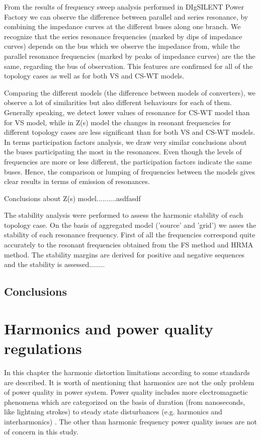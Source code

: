\documentclass[12pt]{report} %
\begin{document}
From the results of frequency sweep analysis performed in DIgSILENT Power Factory we can observe the difference between parallel and series resonance, by combining the impedance curves at the different buses along one branch. We recognize that the series resonance frequencies (marked by dips of impedance curves) depends on the bus which we observe the impedance from, while the parallel resonance frequencies (marked by peaks of impedance curves) are the the same, regarding the bus of observation. This features are confirmed for all of the topology cases as well as for both VS and CS-WT models.

Comparing the different models (the difference between models of converters), we observe a lot of similarities but also different behaviours for each of them. Generally speaking, we detect lower values of resonance for CS-WT model than for VS model, while in Z(s) model the changes in resonant frequencies for different topology cases are less significant than for both VS and CS-WT models. In terms participation factors analysis, we draw very similar conclusions about the buses participating the most in the resonances. Even though the levels of frequencies are more or less different, the participation factors indicate the same buses. Hence, the comparison or lumping of frequencies between the models gives clear results in terms of emission of resonances.

Conclusions about Z(s) model..........asdfasdf

The stability analysis were performed to assess the harmonic stability of each topology case. On the basis of aggregated model ('source' and 'grid') we asses the stability of each resonance frequency. First of all the frequencies correspond quite accurately to the resonant frequencies obtained from the FS method and HRMA method. The stability margins are derived for positive and negative sequences and the stability is assessed........

\section{Conclusions}

\chapter{Harmonics and power quality regulations} \label{sec:harmonicregulations}
In this chapter the harmonic distortion limitations according to some standards are described. It is worth of mentioning that harmonics are not the only problem of power quality in power system. Power quality includes more electromagnetic phenomena which are categorized on the basis of duration (from nanoseconds, like lightning strokes) to steady state disturbances (e.g. harmonics and interharmonics) \cite{das}. The other than harmonic frequency power quality issues are not of concern in this study. 
\end{document}
